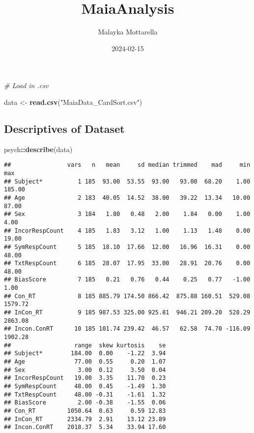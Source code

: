 \documentclass[
]{article}
\title{MaiaAnalysis}
\author{Malayka Mottarella}
\date{2024-02-15}
\newenvironment{Shaded}{\begin{snugshade}}{\end{snugshade}}
\newcommand{\CommentTok}[1]{\textcolor[rgb]{0.56,0.35,0.01}{\textit{#1}}}
\newcommand{\FunctionTok}[1]{\textcolor[rgb]{0.13,0.29,0.53}{\textbf{#1}}}
\newcommand{\NormalTok}[1]{#1}
\newcommand{\OtherTok}[1]{\textcolor[rgb]{0.56,0.35,0.01}{#1}}
\newcommand{\SpecialCharTok}[1]{\textcolor[rgb]{0.81,0.36,0.00}{\textbf{#1}}}
\newcommand{\StringTok}[1]{\textcolor[rgb]{0.31,0.60,0.02}{#1}}
\begin{document}
\maketitle

{
\setcounter{tocdepth}{2}
\tableofcontents
}
\begin{Shaded}
\begin{Highlighting}[]
\CommentTok{\# Load in .csv}

\NormalTok{data }\OtherTok{\textless{}{-}} \FunctionTok{read.csv}\NormalTok{(}\StringTok{"MaiaData\_CardSort.csv"}\NormalTok{)}
\end{Highlighting}
\end{Shaded}

\hypertarget{descriptives-of-dataset}{%
\subsection{Descriptives of Dataset}\label{descriptives-of-dataset}}

\begin{Shaded}
\begin{Highlighting}[]
\NormalTok{psych}\SpecialCharTok{::}\FunctionTok{describe}\NormalTok{(data)}
\end{Highlighting}
\end{Shaded}

\begin{verbatim}
##                vars   n   mean     sd median trimmed    mad     min     max
## Subject*          1 185  93.00  53.55  93.00   93.00  68.20    1.00  185.00
## Age               2 183  40.05  14.52  38.00   39.22  13.34   10.00   87.00
## Sex               3 184   1.80   0.48   2.00    1.84   0.00    1.00    4.00
## IncorRespCount    4 185   1.83   3.12   1.00    1.13   1.48    0.00   19.00
## SymRespCount      5 185  18.10  17.66  12.00   16.96  16.31    0.00   48.00
## TxtRespCount      6 185  28.07  17.95  33.00   28.91  20.76    0.00   48.00
## BiasScore         7 185   0.21   0.76   0.44    0.25   0.77   -1.00    1.00
## Con_RT            8 185 885.79 174.50 866.42  875.88 160.51  529.08 1579.72
## InCon_RT          9 185 987.53 325.00 925.81  946.21 209.20  528.29 2863.08
## Incon.ConRT      10 185 101.74 239.42  46.57   62.58  74.70 -116.09 1902.28
##                  range  skew kurtosis    se
## Subject*        184.00  0.00    -1.22  3.94
## Age              77.00  0.55     0.20  1.07
## Sex               3.00  0.12     3.50  0.04
## IncorRespCount   19.00  3.35    11.70  0.23
## SymRespCount     48.00  0.45    -1.49  1.30
## TxtRespCount     48.00 -0.31    -1.61  1.32
## BiasScore         2.00 -0.38    -1.55  0.06
## Con_RT         1050.64  0.63     0.59 12.83
## InCon_RT       2334.79  2.91    13.12 23.89
## Incon.ConRT    2018.37  5.34    33.94 17.60
\end{verbatim}
\end{document}
